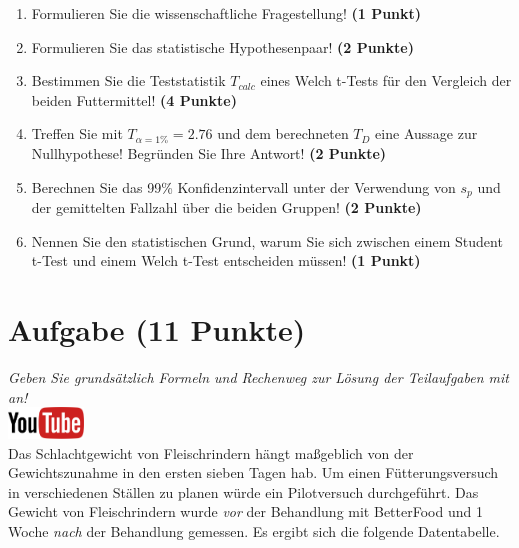 \documentclass[a4paper, 9pt]{scrartcl}\usepackage[]{graphicx}\usepackage[]{xcolor}
\begin{document}
\begin{enumerate}
  \item Formulieren Sie die wissenschaftliche Fragestellung! \textbf{(1 Punkt)}
  \item Formulieren Sie das statistische Hypothesenpaar! \textbf{(2
      Punkte)}
  \item Bestimmen Sie die Teststatistik $T_{calc}$ eines Welch t-Tests f{\"u}r den
  Vergleich der beiden Futtermittel! \textbf{(4 Punkte)}
\item Treffen Sie mit $T_{\alpha = 1\%} = 2.76$ und dem berechneten $T_{D}$ eine Aussage
  zur Nullhypothese! Begr{\"u}nden Sie Ihre Antwort! \textbf{(2 Punkte)}
\item Berechnen Sie das 99\% Konfidenzintervall unter der
  Verwendung von $s_p$ und der gemittelten Fallzahl {\"u}ber die beiden Gruppen! \textbf{(2 Punkte)}
\item Nennen Sie den statistischen Grund, warum Sie sich zwischen einem Student t-Test und einem
  Welch t-Test entscheiden m{\"u}ssen! \textbf{(1 Punkt)}
\end{enumerate} 
\clearpage

\section{Aufgabe \hfill (11 Punkte)}

\textit{Geben Sie grunds{\"a}tzlich Formeln und Rechenweg zur L{\"o}sung der
  Teilaufgaben mit an!} \\[1Ex]

\hfill\href{https://youtu.be/QR90zyn0Iz8}{\includegraphics[width =
  2cm]{img/youtube}}\\[1Ex]



Das Schlachtgewicht von Fleischrindern h{\"a}ngt ma{\ss}geblich von der
Gewichtszunahme in den ersten sieben Tagen hab. Um einen F{\"u}tterungsversuch
in verschiedenen St{\"a}llen zu planen w{\"u}rde ein Pilotversuch durchgef{\"u}hrt. Das
Gewicht von Fleischrindern wurde \textit{vor} der Behandlung mit
BetterFood und 1 Woche \textit{nach} der Behandlung gemessen. Es ergibt
sich die folgende Datentabelle.
\end{document}

